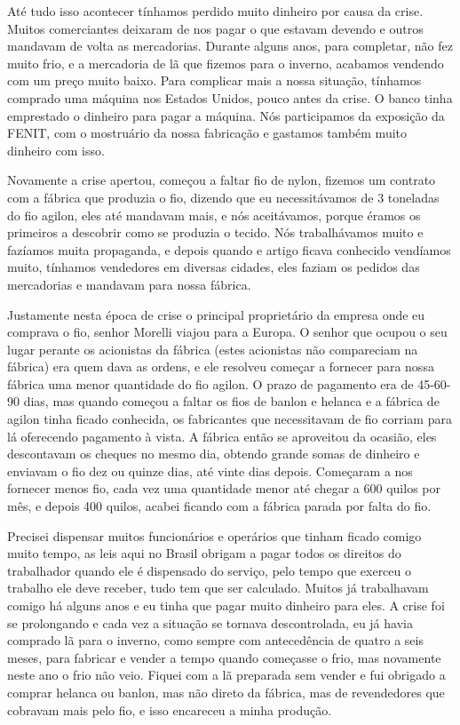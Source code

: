 Até tudo isso acontecer tínhamos perdido muito dinheiro por causa da
crise. Muitos comerciantes deixaram de nos pagar o que estavam devendo e
outros mandavam de volta as mercadorias. Durante alguns anos, para
completar, não fez muito frio, e a mercadoria de lã que fizemos para o
inverno, acabamos vendendo com um preço muito baixo. Para complicar mais
a nossa situação, tínhamos comprado uma máquina nos Estados Unidos,
pouco antes da crise. O banco tinha emprestado o dinheiro para pagar a
máquina. Nós participamos da exposição da FENIT, com o mostruário da
nossa fabricação e gastamos também muito dinheiro com isso.

Novamente a crise apertou, começou a faltar fio de nylon, fizemos um
contrato com a fábrica que produzia o fio, dizendo que eu necessitávamos
de 3 toneladas do fio agilon, eles até mandavam mais, e nós aceitávamos,
porque éramos os primeiros a descobrir como se produzia o tecido. Nós
trabalhávamos muito e fazíamos muita propaganda, e depois quando e
artigo ficava conhecido vendíamos muito, tínhamos vendedores em diversas
cidades, eles faziam os pedidos das mercadorias e mandavam para nossa
fábrica.

Justamente nesta época de crise o principal proprietário da empresa onde
eu comprava o fio, senhor Morelli viajou para a Europa. O senhor que
ocupou o seu lugar perante os acionistas da fábrica (estes acionistas
não compareciam na fábrica) era quem dava as ordens, e ele resolveu
começar a fornecer para nossa fábrica uma menor quantidade do fio
agilon. O prazo de pagamento era de 45-60-90 dias, mas quando começou a
faltar os fios de banlon e helanca e a fábrica de agilon tinha ficado
conhecida, os fabricantes que necessitavam de fio corriam para lá
oferecendo pagamento à vista. A fábrica então se aproveitou da ocasião,
eles descontavam os cheques no mesmo dia, obtendo grande somas de
dinheiro e enviavam o fio dez ou quinze dias, até vinte dias depois.
Começaram a nos fornecer menos fio, cada vez uma quantidade menor até
chegar a 600 quilos por mês, e depois 400 quilos, acabei ficando com a
fábrica parada por falta do fio.

Precisei dispensar muitos funcionários e operários que tinham ficado
comigo muito tempo, as leis aqui no Brasil obrigam a pagar todos os
direitos do trabalhador quando ele é dispensado do serviço, pelo tempo
que exerceu o trabalho ele deve receber, tudo tem que ser calculado.
Muitos já trabalhavam comigo há alguns anos e eu tinha que pagar muito
dinheiro para eles. A crise foi se prolongando e cada vez a situação se
tornava descontrolada, eu já havia comprado lã para o inverno, como
sempre com antecedência de quatro a seis meses, para fabricar e vender a
tempo quando começasse o frio, mas novamente neste ano o frio não veio.
Fiquei com a lã preparada sem vender e fui obrigado a comprar helanca ou
banlon, mas não direto da fábrica, mas de revendedores que cobravam mais
pelo fio, e isso encareceu a minha produção.


